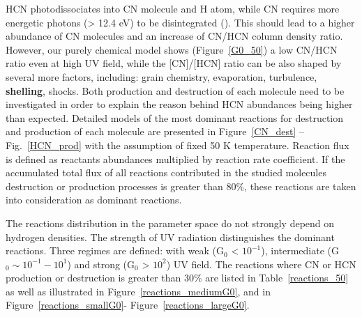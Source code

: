 \documentclass{aa}
\begin{document}

HCN photodissociates into CN molecule and H atom, while CN requires more energetic photons (> 12.4
eV) to be disintegrated (\citealt{vDi87}). This should lead to a higher abundance of CN molecules and
an increase of CN/HCN column density ratio. However, our purely chemical model shows (Figure~\ref{G0_50}) a low CN/HCN ratio even at high UV field, while the [CN]/[HCN] ratio can be also shaped by several more factors, including: grain chemistry, evaporation, turbulence, \textbf{shelling}, shocks. Both production and destruction of each molecule need to be investigated in order to explain the reason behind HCN abundances being higher than expected. Detailed models of the most dominant
reactions for destruction and production of each molecule are presented in Figure~\ref{CN_dest} –
Fig.~\ref{HCN_prod} with the assumption of fixed 50 K temperature. Reaction flux is defined as
reactants abundances multiplied by reaction rate coefficient. If the accumulated total flux of all reactions contributed in the studied molecules destruction or production processes is greater than 80$\%$, these reactions are taken into consideration as dominant reactions.

The reactions distribution in the parameter space do not strongly depend on hydrogen
densities. The strength of UV radiation distinguishes the
dominant reactions. Three regimes are defined: with weak (G$_0$ < $10^{-1}$), intermediate (G$_0 \sim 10^{-1}-10^1$) and strong (G$_0$ > $10^{2}$) UV field. The reactions where CN or HCN production or destruction is greater than 30$\%$ are listed
in Table~\ref{reactions_50} as well as illustrated in Figure~\ref{reactions_mediumG0}, and in Figure~\ref{reactions_smallG0}-
Figure~\ref{reactions_largeG0}.
\end{document}
